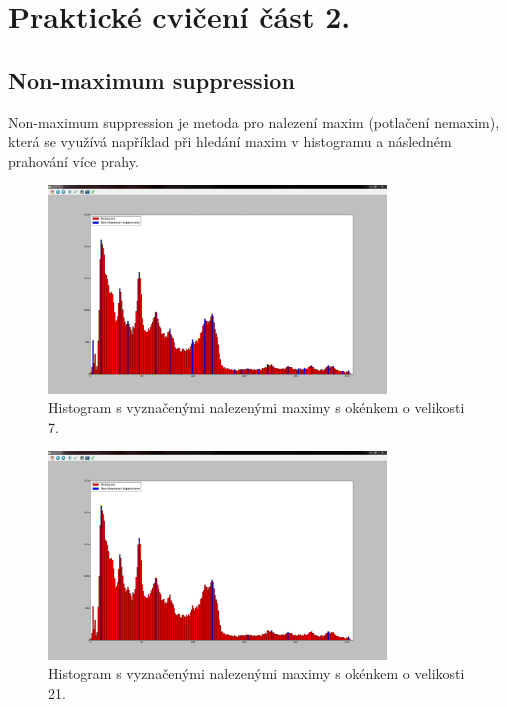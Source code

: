 \documentclass[12pt, a4paper]{article}
\begin{document}
\newpage















\section{Praktické cvičení část 2.}

\subsection*{Non-maximum suppression}
\par{Non-maximum suppression je metoda pro nalezení maxim (potlačení nemaxim), která se využívá například při hledání maxim v histogramu a následném prahování více prahy.}

\begin{figure}[!ht]
	\centering
	\includegraphics[width=0.8\textwidth]{Non_maximum_suppression.png}
	\caption{Histogram s vyznačenými nalezenými maximy s okénkem o velikosti 7.}
	\label{fig:Non_maximum_suppression}
\end{figure}

\begin{figure}[!ht]
	\centering
	\includegraphics[width=0.8\textwidth]{Non_maximum_suppression02.png}
	\caption{Histogram s vyznačenými nalezenými maximy s okénkem o velikosti 21.}
	\label{fig:Non_maximum_suppression02}
\end{figure}
\end{document}

